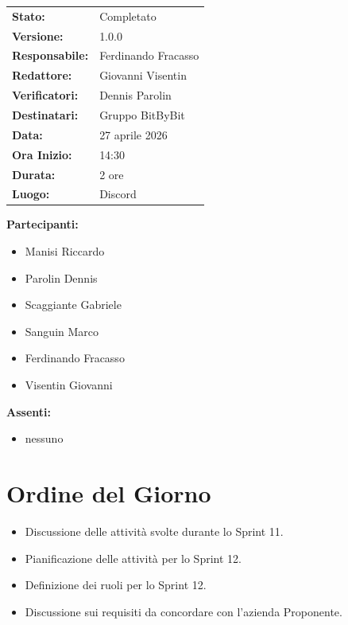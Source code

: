 \documentclass[a4paper,12pt]{article}
\begin{document}
\begin{tcolorbox}
\begin{tabularx}{\textwidth}{@{}l X@{}}
\textbf{Stato:} & Completato\\
\textbf{Versione:} & 1.0.0\\
\textbf{Responsabile:} & Ferdinando Fracasso \\
\textbf{Redattore:} & Giovanni Visentin \\
\textbf{Verificatori:} & Dennis Parolin \\
\textbf{Destinatari:} & Gruppo BitByBit \\
\textbf{Data:} & 27 aprile 2026 \\
\textbf{Ora Inizio:} & 14:30 \\
\textbf{Durata:} & 2 ore \\
\textbf{Luogo:} & Discord \\
\end{tabularx}
\end{tcolorbox}

\vspace{0.4cm}
\textbf{Partecipanti:}
\begin{itemize}
    \item Manisi Riccardo
    \item Parolin Dennis
    \item Scaggiante Gabriele
    \item Sanguin Marco
    \item Ferdinando Fracasso
    \item Visentin Giovanni
\end{itemize}

\textbf{Assenti:}
\begin{itemize}
    \item nessuno
\end{itemize}

\clearpage

\vspace{0.5cm}

\vspace{0.8cm}

\clearpage
\tableofcontents
\thispagestyle{empty} %
\clearpage


\section{Ordine del Giorno}
\begin{itemize}
    \item Discussione delle attività svolte durante lo Sprint 11.
    \item Pianificazione delle attività per lo Sprint 12.
    \item Definizione dei ruoli per lo Sprint 12.
    \item Discussione sui requisiti da concordare con l'azienda Proponente.
\end{itemize}
\end{document}
